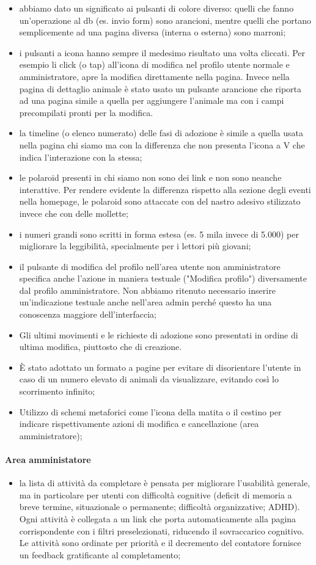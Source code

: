 \begin{itemize}
    \item abbiamo dato un significato ai pulsanti di colore diverso: quelli che fanno un'operazione al db (es. invio form) sono arancioni, mentre quelli che portano semplicemente ad una pagina diversa (interna o esterna) sono marroni;
    \item i pulsanti a icona hanno sempre il medesimo risultato una volta cliccati. Per esempio li click (o tap) all'icona di modifica nel profilo utente normale e amministratore, apre la modifica direttamente nella pagina. Invece nella pagina di dettaglio animale è stato usato un pulsante arancione che riporta ad una pagina simile a quella per aggiungere l'animale ma con i campi precompilati pronti per la modifica.
    \item la timeline (o elenco numerato) delle fasi di adozione è simile a quella usata nella pagina chi siamo ma con la differenza che non presenta l'icona a V che indica l'interazione con la stessa;
    \item le polaroid presenti in chi siamo non sono dei link e non sono neanche interattive. Per rendere evidente la differenza rispetto alla sezione degli eventi nella homepage, le polaroid sono attaccate con del nastro adesivo stilizzato invece che con delle mollette;
    \item i numeri grandi sono scritti in forma estesa (es. 5 mila invece di 5.000) per migliorare la leggibilità, specialmente per i lettori più giovani;
    \item il pulsante di modifica del profilo nell'area utente non amministratore specifica anche l'azione in maniera testuale ("Modifica profilo") diversamente dal profilo amministratore. Non abbiamo ritenuto necessario inserire un'indicazione testuale anche nell'area admin perché questo ha una conoscenza maggiore dell'interfaccia;
    \item Gli ultimi movimenti e le richieste di adozione sono presentati in ordine di ultima modifica, piuttosto che di creazione.
    \item È stato adottato un formato a pagine per evitare di disorientare l'utente in caso di un numero elevato di animali da visualizzare, evitando così lo scorrimento infinito;
    \item Utilizzo di schemi metaforici come l'icona della matita o il cestino per indicare rispettivamente azioni di modifica e cancellazione (area amministratore);
\end{itemize}
\paragraph{Area amministatore}
\begin{itemize}
    \item la lista di attività da completare è pensata per migliorare l'usabilità generale, ma in particolare per utenti con difficoltà cognitive (deficit di memoria a breve termine, situazionale o permanente; difficoltà organizzative; ADHD). Ogni attività è collegata a un link che porta automaticamente alla pagina corrispondente con i filtri preselezionati, riducendo il sovraccarico cognitivo. Le attività sono ordinate per priorità e il decremento del contatore fornisce un feedback gratificante al completamento;
\end{itemize}
